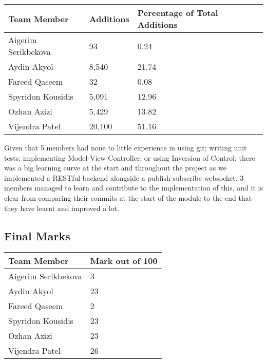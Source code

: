 \documentclass[11pt,a4paper]{report}
\begin{document}
\begin{center}
\begin{tabular}{| l | l | l |}
  \hline
  Team Member & Additions & Percentage of Total Additions\\
  \hline
  Aigerim Serikbekova & 93 & 0.24\\
  \hline
  Aydin Akyol & 8,540 & 21.74\\
  \hline
  Fareed Qaseem & 32 & 0.08\\
  \hline
  Spyridon Kousidis & 5,091 & 12.96\\
  \hline
  Ozhan Azizi & 5,429 & 13.82\\
  \hline
  Vijendra Patel & 20,100 & 51.16\\
  \hline
\end{tabular}
\end{center}

Given that 5 members had none to little experience in using git; writing unit tests; implementing Model-View-Controller; or using Inversion of Control; there was a big learning curve at the start and throughout the project as we implemented a RESTful backend alongside a publish-subscribe websocket. 3 members managed to learn and contribute to the implementation of this, and it is clear from comparing their commits at the start of the module to the end that they have learnt and improved a lot.

\subsection{Final Marks}

\begin{center}
\begin{tabular}{| l | l |}
  \hline
  Team Member & Mark out of 100 \\
  \hline
  Aigerim Serikbekova & 3\\
  \hline
  Aydin Akyol & 23\\
  \hline
  Fareed Qaseem & 2\\
  \hline
  Spyridon Kousidis & 23\\
  \hline
  Ozhan Azizi & 23\\
  \hline
  Vijendra Patel & 26\\
  \hline
\end{tabular}
\end{center}


{}
\end{document}
